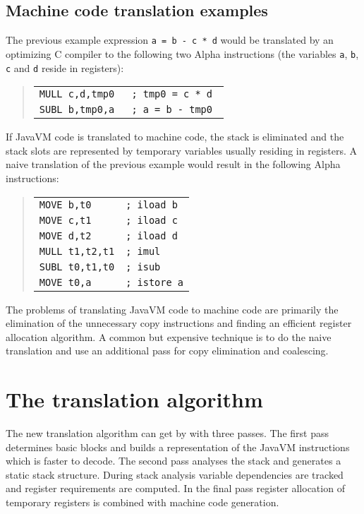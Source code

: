 \subsection{Machine code translation examples}

The previous example expression {\tt a = b - c * d} would be translated
by an optimizing C compiler to the following two Alpha instructions (the
variables {\tt a}, {\tt b}, {\tt c} and {\tt d} reside in registers):

\begin{quote}
\begin{tabular}{ll}
{\tt MULL c,d,tmp0 }&{\tt ; tmp0 = c * d }\\
{\tt SUBL b,tmp0,a }&{\tt ; a = b - tmp0 }\\
\end{tabular} 
\end{quote}

If JavaVM code is translated to machine code, the stack is eliminated and
the stack slots are represented by temporary variables usually residing in
registers. A naive translation of the previous example would result in the
following Alpha instructions:

\begin{quote}
\begin{tabular}{ll}
{\tt MOVE b,t0    }&{\tt ; iload b } \\
{\tt MOVE c,t1    }&{\tt ; iload c } \\
{\tt MOVE d,t2    }&{\tt ; iload d } \\
{\tt MULL t1,t2,t1}&{\tt ; imul    } \\
{\tt SUBL t0,t1,t0}&{\tt ; isub    } \\
{\tt MOVE t0,a    }&{\tt ; istore a} \\
\end{tabular} 
\end{quote}

The problems of translating JavaVM code to machine code are primarily the
elimination of the unnecessary copy instructions and finding an efficient
register allocation algorithm. A common but expensive technique is to do
the naive translation and use an additional pass for copy elimination and
coalescing.


\section{The translation algorithm}

The new translation algorithm can get by with three passes. The first pass
determines basic blocks and builds a representation of the JavaVM 
instructions which is faster to decode. The second pass analyses the stack
and generates a static stack structure. During stack analysis variable
dependencies are tracked and register requirements are computed. In the
final pass register allocation of temporary registers is combined with
machine code generation.

